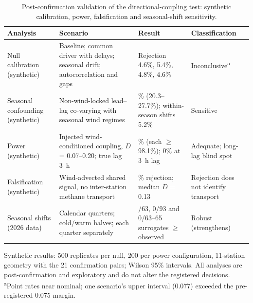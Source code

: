 \begin{table}[!t]
\centering
\caption{Post-confirmation validation of the directional-coupling test: synthetic calibration, power, falsification and seasonal-shift sensitivity.}
\label{tab:validation}
\begin{tabularx}{\textwidth}{@{}>{\raggedright\arraybackslash}p{}>{\raggedright\arraybackslash}X>{\raggedright\arraybackslash}p{}>{\raggedright\arraybackslash}p{}@{}}
\toprule
Analysis & Scenario & Result & Classification \\
\midrule
Null calibration (synthetic) & Baseline; common driver with delays; seasonal drift; autocorrelation and gaps & Rejection 4.6\%, 5.4\%, 4.8\%, 4.6\% & Inconclusive\textsuperscript{a} \\
Seasonal confounding (synthetic) & Non-wind-locked lead--lag co-varying with seasonal wind regimes & 23.8\% (20.3--27.7\%); within-season shifts 5.2\% & Sensitive \\
Power (synthetic) & Injected wind-conditioned coupling, $D$ = 0.07--0.20; true lag 3~h & 100\% (each $\geq$98.1\%); 0\% at 3~h lag & Adequate; long-lag blind spot \\
Falsification (synthetic) & Wind-advected shared signal, no inter-station methane transport & 100\% rejection; median $D$ = 0.13 & Rejection does not identify transport \\
Seasonal shifts (2026 data) & Calendar quarters; cold/warm halves; each quarter separately & 0/63, 0/93 and 0/63--65 surrogates $\geq$ observed & Robust (strengthens) \\
\bottomrule
\end{tabularx}
\par\smallskip\begin{minipage}{\textwidth}\footnotesize
Synthetic results: 500 replicates per null, 200 per power configuration, 11-station geometry with the 21 confirmation pairs; Wilson 95\% intervals. All analyses are post-confirmation and exploratory and do not alter the registered decisions. \textsuperscript{a}Point rates near nominal; one scenario's upper interval (0.077) exceeded the pre-registered 0.075 margin.
\end{minipage}
\end{table}

